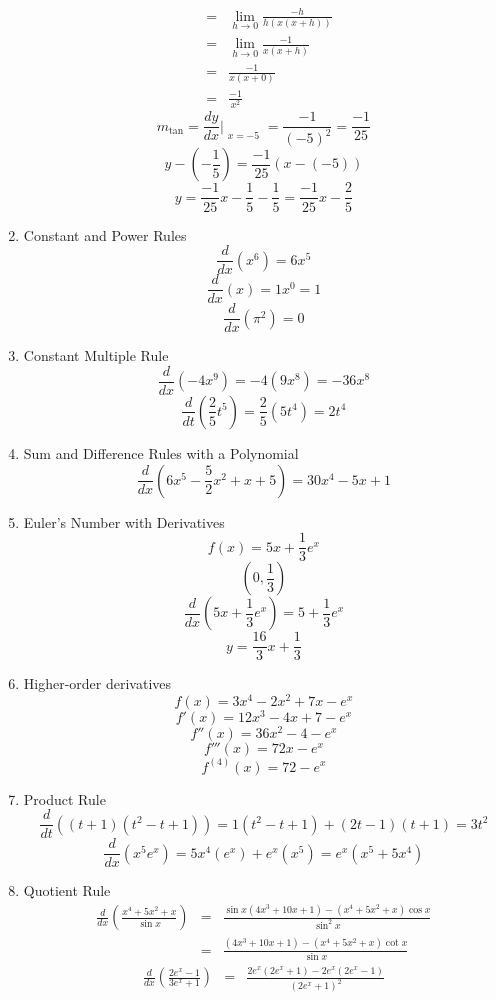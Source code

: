 \documentclass{article}
\begin{document}
\begin{enumerate}
\begin{eqnarray}
                      &=& \lim_{h \to 0}{\frac{-h}{h(x(x + h))}} \\
                      &=& \lim_{h \to 0}{\frac{-1}{x(x + h)}} \\
                      &=& \frac{-1}{x(x + 0)} \\
                      &=& \frac{-1}{x^2}
    \end{eqnarray}
    $$m_{\tan} = \frac{dy}{dx}\Bigr|_{\substack{x=-5}} = \frac{-1}{(-5)^2} = \frac{-1}{25}$$
    $$y - (- \frac{1}{5}) = \frac{-1}{25}(x - (-5))$$
    $$y = \frac{-1}{25}x - \frac{1}{5} - \frac{1}{5} = \frac{-1}{25}x - \frac{2}{5}$$
    \item Constant and Power Rules
    $$\frac{d}{dx}\left(x^6\right) = 6x^5$$
    $$\frac{d}{dx}\left(x\right) = 1x^0 = 1$$
    $$\frac{d}{dx}\left(\pi^2\right) = 0$$
    \item Constant Multiple Rule
    $$\frac{d}{dx}\left(-4x^9\right) = -4\left(9x^8\right) = -36x^8$$
    $$\frac{d}{dt}\left(\frac{2}{5}t^5\right) = \frac{2}{5}\left(5t^4\right) = 2t^4$$
    \item Sum and Difference Rules with a Polynomial
    $$\frac{d}{dx}\left(6x^5 - \frac{5}{2}x^2 + x + 5\right) = 30x^4 - 5x + 1$$
    \item Euler's Number with Derivatives
    $$f(x) = 5x + \frac{1}{3}e^x$$
    $$\left(0, \frac{1}{3}\right)$$
    $$\frac{d}{dx}\left(5x + \frac{1}{3}e^x\right) = 5 + \frac{1}{3}e^x$$
    $$y = \frac{16}{3}x + \frac{1}{3}$$
    \item Higher-order derivatives
    $$f(x) = 3x^4 - 2x^2 + 7x - e^x$$
    $$f'(x) = 12x^3 - 4x + 7 - e^x$$
    $$f''(x) = 36x^2 - 4 - e^x$$
    $$f'''(x) = 72x - e^x$$
    $$f^{(4)}(x) = 72 - e^x$$
    \item Product Rule
    $$\frac{d}{dt}\left((t + 1)(t^2 - t + 1)\right) = 1(t^2 - t + 1) + (2t - 1)(t + 1) = 3t^2$$
    $$\frac{d}{dx}\left(x^5e^x\right) = 5x^4(e^x) + e^x(x^5) = e^x\left(x^5 + 5x^4\right)$$
    \item Quotient Rule
    \begin{eqnarray}
        \frac{d}{dx}\left(\frac{x^4 + 5x^2 + x}{\sin{x}}\right) &=& \frac{\sin{x}(4x^3 + 10x + 1) - (x^4 + 5x^2 + x)\cos{x}}{\sin^2{x}} \\
                                                                &=& \frac{(4x^3 + 10x + 1) - (x^4 + 5x^2 + x)\cot{x}}{\sin{x}}
    \end{eqnarray}
    \begin{eqnarray}
        \frac{d}{dx}\left(\frac{2e^x - 1}{3e^x + 1}\right) &=& \frac{2e^x(2e^x + 1) - 2e^x(2e^x - 1)}{(2e^x + 1)^2} \\

\end{eqnarray}
\end{enumerate}
\end{document}
